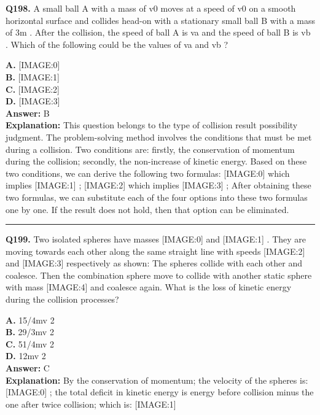 \documentclass[12pt]{article}
\begin{document}
\noindent
\textbf{Q198.} A small ball A with a mass of v0
moves at a speed of v0
on a smooth horizontal surface and collides head-on with a stationary small ball B with a mass of 3m
. After the collision, the speed of ball A is va
and the speed of ball B is vb
. Which of the following could be the values of va
and vb
?



\textbf{A.} [IMAGE:0] \\
\textbf{B.} [IMAGE:1] \\
\textbf{C.} [IMAGE:2] \\
\textbf{D.} [IMAGE:3] \\

\textbf{Answer:} B \\
\textbf{Explanation:} This question belongs to the type of collision result possibility judgment. The problem-solving method involves the conditions that must be met during a collision. Two conditions are: firstly, the conservation of momentum during the collision; secondly, the non-increase of kinetic energy.
Based on these two conditions, we can derive the following two formulas:
[IMAGE:0]
which implies
[IMAGE:1]
;
[IMAGE:2]
which implies
[IMAGE:3]
;
After obtaining these two formulas, we can substitute each of the four options into these two formulas one by one. If the result does not hold, then that option can be eliminated.

\hrule
\vspace{1em}


\noindent
\textbf{Q199.} Two isolated spheres have masses
[IMAGE:0]
and
[IMAGE:1]
. They are moving towards each other along the same straight line with speeds
[IMAGE:2]
and
[IMAGE:3]
respectively as shown:
The spheres collide with each other and coalesce. Then the combination sphere move to collide with another static sphere with mass
[IMAGE:4]
and coalesce again. What is the loss of kinetic energy during the collision processes?



\textbf{A.} 15/4mv
2 \\
\textbf{B.} 29/3mv
2 \\
\textbf{C.} 51/4mv
2 \\
\textbf{D.} 12mv
2 \\

\textbf{Answer:} C \\
\textbf{Explanation:} By the conservation of momentum; the velocity of the spheres is:
[IMAGE:0]
; the total deficit in kinetic energy is energy before collision minus the one after twice collision; which is:
[IMAGE:1]
\end{document}
